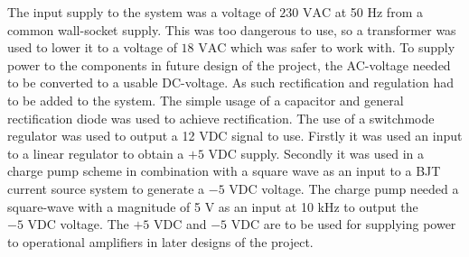 The input supply to the system was a voltage of $230 \text{ VAC}$ at 50 Hz from a common wall-socket supply. This was too dangerous to use, so a transformer was used to lower it to a voltage of  $18 \text{ VAC}$ which was safer to work with. To supply power to the components in future design of the project, the AC-voltage needed to be converted to a usable DC-voltage. As such rectification and regulation had to be added to the system. The simple usage of a capacitor and general rectification diode was used to achieve rectification. The use of a switchmode regulator was used to output a 12 VDC signal to use. Firstly it was used an input to a linear regulator to obtain a $+5 \text{ VDC}$ supply. Secondly it was used in a charge pump scheme in combination with a square wave  as an input to a BJT current source system to generate a $-5 \text{ VDC}$ voltage. The charge pump needed a square-wave with a magnitude of 5 V as an input at 10 kHz to output the $-5 \text{ VDC}$ voltage. The $+5 \text{ VDC}$ and $-5 \text{ VDC}$ are to be used for supplying power to operational amplifiers in later designs of the project.








